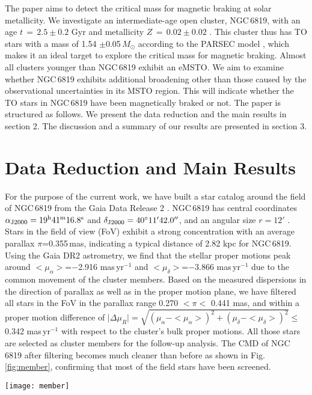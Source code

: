 \documentclass[twocolumn]{aastex631}
\begin{document}
The paper aims to detect the critical mass for magnetic braking at solar metallicity. We investigate an intermediate-age open cluster, NGC\,6819, with an age $t \,=\,2.5\pm0.2$ Gyr \citep{2013AJ....146...58J} and metallicity $Z \,= \,0.02\pm0.02$ \citep{leebrown2015spectroscopic}. This cluster thus has TO stars with a mass of 1.54 $\pm$0.05\,$M_{\odot}$ according to the PARSEC model \citep{2012MNRAS.427..127B, Marigo2017A}, which makes it an ideal target to explore the critical mass for magnetic braking. Almost all clusters younger than NGC\,6819 exhibit an eMSTO. We aim to examine whether  NGC\,6819 exhibits additional broadening other than those caused by the observational uncertainties in its MSTO region. This will indicate whether the TO stars in NGC\,6819 have been magnetically braked or not. The paper is structured as follows. We present the data reduction and the main results in section 2. The discussion and a summary of our results are presented in section 3.  


\section{Data Reduction and Main Results} 
For the purpose of the current work, we have built a star catalog around the field of NGC\,6819 from the Gaia Data Release 2 \citep[Gaia DR2;][]{2018AA...616A...1G}. NGC$\,$6819 has  central coordinates $\alpha_{\rm J2000}=19^{\rm h}41^{\rm m}16.8^{\rm s}$ and $\delta_{\rm J2000}=40^{\circ}11'42.0''$, and an angular size $r=12'$ \citep{kharchenko2013global}. Stars in the field of view (FoV) exhibit a strong concentration with an average parallax $\pi$=0.355\,mas, indicating a typical distance of 2.82 kpc for NGC\,6819. Using the Gaia DR2 astrometry, we find that the stellar proper motions peak around $<\mu_{\alpha}>$=$-$2.916 mas\,yr$^{-1}$ and  $<\mu_{\delta}>$=$-$3.866 mas\,yr$^{-1}$ due to the common movement of the cluster members. Based on the measured dispersions in the direction of parallax as well as in the proper motion plane, we have filtered all stars in the FoV in the parallax range 0.270 $<\pi<$ 0.441 mas, and within a proper motion difference of $\mid\Delta\mu_{R}\mid=\sqrt{(\mu_{\alpha}-<\mu_{\alpha}>)^2+(\mu_{\delta}-<\mu_{\delta}>)^2}\le$\,0.342 mas\,yr$^{-1}$ with respect to the cluster's bulk proper motions. All those stars are selected as cluster members for the follow-up analysis. The CMD of NGC 6819 after filtering becomes much cleaner than before as shown in  Fig.\,\ref{fig:member}, confirming that most of the field stars have been screened. 
\begin{figure*}
	\centering
	\texttt{[image: member]}
	\caption{Upper-left: spatial distribution of all stars selected from Gaia DR2 in the field of NGC 6819. Upper-right: the parallax distribution of all stars. The two red dashed lines represent the boundaries applied to select cluster members. Bottom-left: vector-point diagram of the proper motions in the cluster field. Bottom-right: the CMD of all stars in the cluster field. Selected cluster members are represented with red points.}
	\label{fig:member}
\end{figure*}
\end{document}
